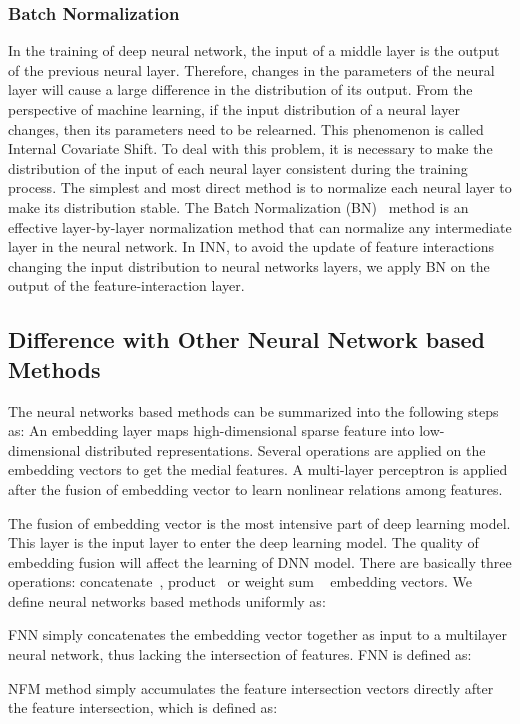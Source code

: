 \documentclass[journal]{IEEEtran}
\begin{document}
\subsubsection{Batch Normalization}
In the training of deep neural network, the input of a middle layer is the output of the previous neural layer. Therefore, changes in the parameters of the neural layer will cause a large difference in the distribution of its output. From the perspective of machine learning, if the input distribution of a neural layer changes, then its parameters need to be relearned. This phenomenon is called Internal Covariate Shift. To deal with this problem, it is necessary to make the distribution of the input of each neural layer consistent during the training process. The simplest and most direct method is to normalize each neural layer to make its distribution stable. The Batch Normalization (BN)~\cite{24} method is an effective layer-by-layer normalization method that can normalize any intermediate layer in the neural network. In INN, to avoid the update of feature interactions changing the input distribution to neural networks layers, we apply BN on the output of the feature-interaction layer.
\subsection{Difference with Other Neural Network based Methods}
The neural networks based methods can be summarized into the following steps as:  An embedding layer maps high-dimensional sparse feature into low-dimensional distributed representations.  Several operations are applied on the embedding vectors to get the medial features.  A multi-layer perceptron  is applied  after the fusion of embedding vector to learn nonlinear relations among features.

The fusion of embedding vector is the most intensive part of deep learning model. This layer is the input layer to enter the deep learning model. The quality of embedding fusion will affect the learning of DNN model. There are basically three operations: concatenate~\cite{30,29}, product~\cite{29} or weight sum ~\cite{21,32,1} embedding vectors. We define neural networks based methods uniformly as:

FNN simply concatenates the embedding vector together as input to a multilayer neural network, thus lacking the intersection of features. FNN is defined as:

NFM method simply accumulates the feature intersection vectors directly after the feature intersection, which is defined as:
\end{document}
